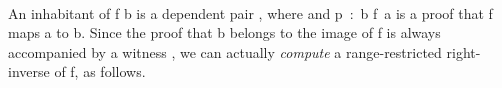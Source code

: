 \begin{code}%
\>[0]\<%
\\
\>[0]\AgdaSpace{}%
\AgdaModule{\AgdaUnderscore{}}\AgdaSpace{}%
\AgdaSymbol{\{}\AgdaSpace{}%
\AgdaSymbol{:}\AgdaSpace{}%
\AgdaSpace{}%
\AgdaSpace{}%
\AgdaSymbol{\}\{}\AgdaSpace{}%
\AgdaSymbol{:}\AgdaSpace{}%
\AgdaSpace{}%
\AgdaSpace{}%
\AgdaSymbol{\}}\AgdaSpace{}%
\<%
\\
\>[0][@{}l@{\AgdaIndent{0}}]%
\>[1]\AgdaSpace{}%
\AgdaSpace{}%
\AgdaSpace{}%
\AgdaSpace{}%
\AgdaSymbol{(}\AgdaSpace{}%
\AgdaSpace{}%
\AgdaSymbol{;}\AgdaSpace{}%
\AgdaSpace{}%
\AgdaSymbol{)}\AgdaSpace{}%
\AgdaSpace{}%
\AgdaSymbol{(}\AgdaSpace{}%
\AgdaSpace{}%
\AgdaSpace{}%
\AgdaSpace{}%
\AgdaSymbol{)}\<%
\\
%
\\[\AgdaEmptyExtraSkip]%
%
\>[1]\AgdaSpace{}%
\AgdaSpace{}%
\AgdaSymbol{(}\AgdaSpace{}%
\AgdaSymbol{:}\AgdaSpace{}%
\AgdaSpace{}%
\AgdaSpace{}%
\AgdaSymbol{)}\AgdaSpace{}%
\AgdaSymbol{:}\AgdaSpace{}%
\AgdaSpace{}%
\AgdaSpace{}%
\AgdaSpace{}%
\AgdaSymbol{(}\AgdaSpace{}%
\AgdaSpace{}%
\AgdaSpace{}%
\AgdaSpace{}%
\AgdaSymbol{)}\AgdaSpace{}%
\<%
\\
\>[1][@{}l@{\AgdaIndent{0}}]%
\>[2]\AgdaSpace{}%
\AgdaSymbol{:}\AgdaSpace{}%
\AgdaSymbol{\{}\AgdaSpace{}%
\AgdaSymbol{:}\AgdaSpace{}%
\AgdaSymbol{\}}\AgdaSpace{}%
\AgdaSpace{}%
\AgdaSpace{}%
\AgdaSpace{}%
\AgdaSpace{}%
\AgdaSpace{}%
\AgdaSpace{}%
\AgdaSpace{}%
\AgdaSpace{}%
\AgdaSpace{}%
\AgdaSpace{}%
\AgdaSpace{}%
\AgdaSpace{}%
\AgdaSpace{}%
\<%
\\
\>[0]\<%
\end{code}
An inhabitant of  \ab f  \ab b is a dependent pair ,
where  and \ab p~\as :~\ab b  \ab f~\ab a is a proof that
\ab f maps \ab a to \ab b.  Since the proof that \ab b
belongs to the image of \ab f is always accompanied by a witness , we can
actually \emph{compute} a range-restricted right-inverse of \ab f, as follows.

